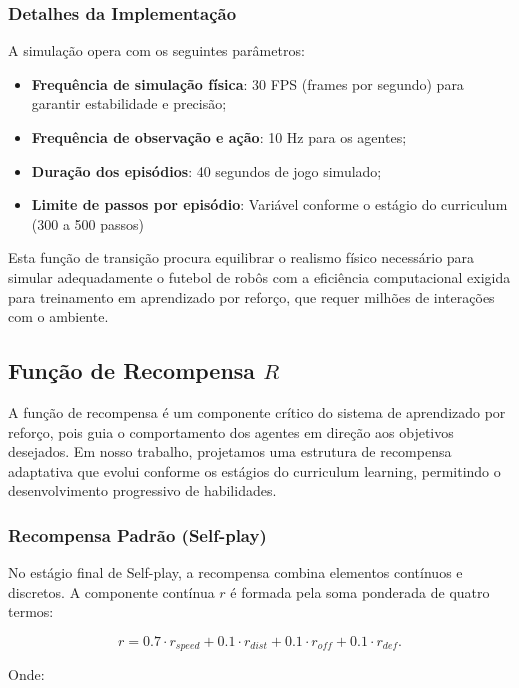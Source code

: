 \subsubsection{Detalhes da Implementação}

A simulação opera com os seguintes parâmetros:

\begin{itemize}
    \item \textbf{Frequência de simulação física}: 30 FPS (frames por segundo) para garantir estabilidade e precisão;
    \item \textbf{Frequência de observação e ação}: 10 Hz para os agentes;
    \item \textbf{Duração dos episódios}: 40 segundos de jogo simulado;
    \item \textbf{Limite de passos por episódio}: Variável conforme o estágio do curriculum (300 a 500 passos)
\end{itemize}

Esta função de transição procura equilibrar o realismo físico necessário para simular adequadamente o futebol de robôs com a eficiência computacional exigida para treinamento em aprendizado por reforço, que requer milhões de interações com o ambiente.

\subsection{Função de Recompensa $R$}

A função de recompensa é um componente crítico do sistema de aprendizado por reforço, pois guia o comportamento dos agentes em direção aos objetivos desejados. Em nosso trabalho, projetamos uma estrutura de recompensa adaptativa que evolui conforme os estágios do curriculum learning, permitindo o desenvolvimento progressivo de habilidades.

\subsubsection{Recompensa Padrão (Self-play)}

No estágio final de Self-play, a recompensa combina elementos contínuos e discretos. A componente contínua $r$ é formada pela soma ponderada de quatro termos:

$$r = 0.7 \cdot r_{speed} + 0.1 \cdot r_{dist} + 0.1 \cdot r_{off} + 0.1 \cdot r_{def}.$$

Onde:

